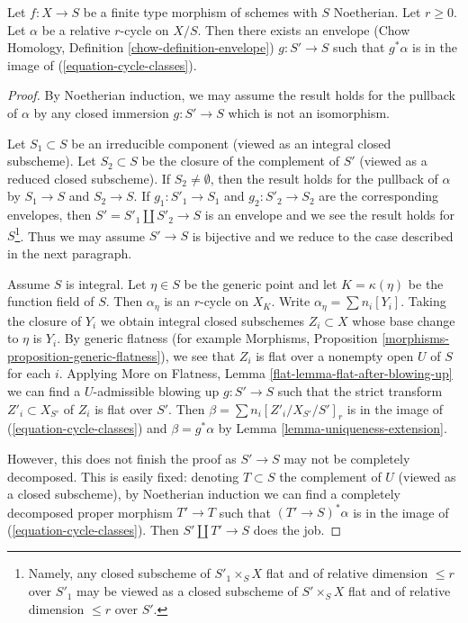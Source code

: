 \begin{lemma}
\label{lemma-get-cycles}
Let $f : X \to S$ be a finite type morphism of schemes with $S$ Noetherian.
Let $r \geq 0$. Let $\alpha$ be a relative $r$-cycle on $X/S$. Then there
exists an envelope (Chow Homology, Definition \ref{chow-definition-envelope})
$g : S' \to S$ such that $g^*\alpha$ is in the image of
(\ref{equation-cycle-classes}).
\end{lemma}

\begin{proof}
By Noetherian induction, we may assume the result holds for the pullback of
$\alpha$ by any closed immersion $g : S' \to S$ which is not an isomorphism.

\medskip\noindent
Let $S_1 \subset S$ be an irreducible component (viewed as an integral closed
subscheme). Let $S_2 \subset S$ be the closure of the complement of $S'$
(viewed as a reduced closed subscheme). If $S_2 \not = \emptyset$, then
the result holds for the pullback of $\alpha$ by $S_1 \to S$ and $S_2 \to S$.
If $g_1 : S'_1 \to S_1$ and $g_2 : S'_2 \to S_2$
are the corresponding envelopes, then $S' = S'_1 \amalg S'_2 \to S$
is an envelope and we see the result holds for $S$\footnote{Namely, any closed
subscheme of $S'_1 \times_S X$ flat and of relative dimension
$\leq r$ over $S'_1$ may be viewed as a closed subscheme of $S' \times_S X$
flat and of relative dimension $\leq r$ over $S'$.}.
Thus we may assume $S' \to S$ is bijective
and we reduce to the case described in the next paragraph.

\medskip\noindent
Assume $S$ is integral. Let $\eta \in S$ be the generic point
and let $K = \kappa(\eta)$ be the function field of $S$.
Then $\alpha_\eta$ is an $r$-cycle on $X_K$.
Write $\alpha_\eta = \sum n_i[Y_i]$.
Taking the closure of $Y_i$ we obtain integral closed subschemes
$Z_i \subset X$ whose base change to $\eta$ is $Y_i$.
By generic flatness (for example Morphisms,
Proposition \ref{morphisms-proposition-generic-flatness}),
we see that $Z_i$ is flat over a nonempty open $U$ of $S$ for each $i$.
Applying More on Flatness, Lemma \ref{flat-lemma-flat-after-blowing-up}
we can find a $U$-admissible blowing up $g : S' \to S$
such that the strict transform $Z'_i \subset X_{S'}$
of $Z_i$ is flat over $S'$. Then $\beta = \sum n_i[Z'_i/X_{S'}/S']_r$
is in the image of (\ref{equation-cycle-classes}) and $\beta = g^*\alpha$
by Lemma \ref{lemma-uniqueness-extension}.

\medskip\noindent
However, this does not finish the proof as $S' \to S$ may not be
completely decomposed. This is easily fixed: denoting $T \subset S$
the complement of $U$ (viewed as a closed subscheme), by Noetherian
induction we can find a completely decomposed proper morphism
$T' \to T$ such that $(T' \to S)^*\alpha$
is in the image of (\ref{equation-cycle-classes}). Then
$S' \amalg T' \to S$ does the job.
\end{proof}

